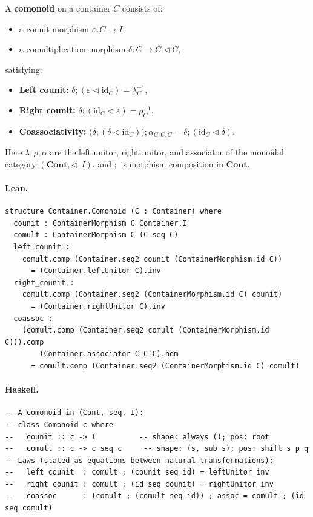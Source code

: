 \documentclass[11pt,a4paper]{article}
\begin{document}
\begin{defn}
A \textbf{comonoid} on a container $C$ consists of:
\begin{itemize}
  \item a counit morphism $\varepsilon : C \to I$,
  \item a comultiplication morphism $\delta : C \to C \triangleleft C$,
\end{itemize}
satisfying:
\begin{itemize}
  \item \textbf{Left counit:}
    $\delta \mathbin{;} (\varepsilon \triangleleft \mathrm{id}_C)
    = \lambda^{-1}_C$,
  \item \textbf{Right counit:}
    $\delta \mathbin{;} (\mathrm{id}_C \triangleleft \varepsilon)
    = \rho^{-1}_C$,
  \item \textbf{Coassociativity:}
    $\bigl(\delta \mathbin{;} (\delta \triangleleft \mathrm{id}_C)\bigr)
      \mathbin{;} \alpha_{C,C,C}
    = \delta \mathbin{;} (\mathrm{id}_C \triangleleft \delta)$.
\end{itemize}
Here $\lambda, \rho, \alpha$ are the left unitor, right unitor, and associator
of the monoidal category $(\mathbf{Cont}, \triangleleft, I)$, and $;$ is morphism
composition in $\mathbf{Cont}$.
\end{defn}

\paragraph{Lean.}
\begin{lstlisting}[style=lean]
structure Container.Comonoid (C : Container) where
  counit : ContainerMorphism C Container.I
  comult : ContainerMorphism C (C seq C)
  left_counit :
    comult.comp (Container.seq2 counit (ContainerMorphism.id C))
      = (Container.leftUnitor C).inv
  right_counit :
    comult.comp (Container.seq2 (ContainerMorphism.id C) counit)
      = (Container.rightUnitor C).inv
  coassoc :
    (comult.comp (Container.seq2 comult (ContainerMorphism.id C))).comp
        (Container.associator C C C).hom
      = comult.comp (Container.seq2 (ContainerMorphism.id C) comult)
\end{lstlisting}

\paragraph{Haskell.}
\begin{lstlisting}[style=haskell]
-- A comonoid in (Cont, seq, I):
-- class Comonoid c where
--   counit :: c -> I          -- shape: always (); pos: root
--   comult :: c -> c seq c     -- shape: (s, sub s); pos: shift s p q
-- Laws (stated as equations between natural transformations):
--   left_counit  : comult ; (counit seq id) = leftUnitor_inv
--   right_counit : comult ; (id seq counit) = rightUnitor_inv
--   coassoc      : (comult ; (comult seq id)) ; assoc = comult ; (id seq comult)
\end{lstlisting}
\end{document}
